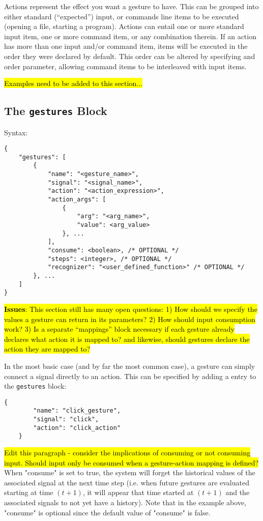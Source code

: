 \documentclass{article}
\begin{document}
Actions represent the effect you want a gesture to have.
This can be grouped into either standard (``expected'') input, or commands line items to be executed (opening a file, starting a program). Actions can entail one or more standard input item, one or more command item, or any combination therein. If an action has more than one input and/or command item, items will be executed in the order they were declared by default. This order can be altered by specifying and order parameter, allowing command items to be interleaved with input items.

\hl{Examples need to be added to this section...}

\subsection{The \texttt{gestures} Block}
Syntax:

\begin{Verbatim}[baselinestretch=1.0]
{
    "gestures": [
        {
            "name": "<gesture_name>",
            "signal": "<signal_name>",
            "action": "<action_expression>",
            "action_args": [
                {
                    "arg": "<arg_name>",
                    "value": <arg_value>
                }, ...
            ],
            "consume": <boolean>, /* OPTIONAL */
            "steps": <integer>, /* OPTIONAL */
            "recognizer": "<user_defined_function>" /* OPTIONAL */
        }, ...
    ]
}
\end{Verbatim}

\noindent
\hl{\textbf{Issues}: This section still has many open questions: 1) How should we specify the values a gesture can return in its parameters? 2) How should input consumption work? 3) Is a separate ``mappings'' block necessary if each gesture already declares what action it is mapped to? and likewise, should gestures declare the action they are mapped to?}

In the most basic case (and by far the most common case), a gesture can simply connect a signal directly to an action.
This can be specified by adding a entry to the \texttt{gestures} block:

\begin{Verbatim}[baselinestretch=1.0]
    {
        "name": "click_gesture",
        "signal": "click",
        "action": "click_action"
    }
\end{Verbatim}

\hl{Edit this paragraph - consider the implications of consuming or not consuming input.
Should input only be consumed when a gesture-action mapping is defined?} When "consume" is set to true, the system will forget the historical values of the associated signal at the next time step (i.e. when future gestures are evaluated starting at time $(t+1)$, it will appear that time started at $(t+1)$ and the associated signals to not yet have a history). Note that in the example above, "consume" is optional since the default value of "consume" is false.
\end{document}
